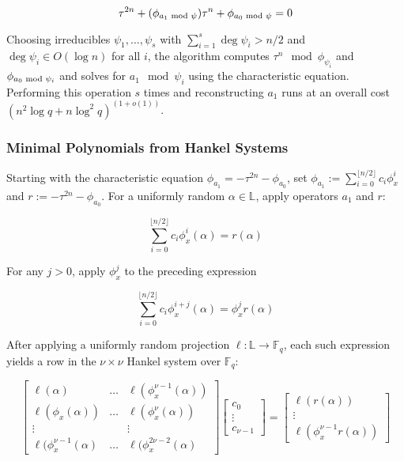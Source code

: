 \documentclass[sigconf]{acmart}
\newcommand{\F}{\mathbb{F}}
\renewcommand{\L}{\mathbb{L}}
\begin{document}
\begin{equation*}
    \tau^{2n} + (\phi_{a_1 \textnormal{ mod } \psi}) \tau^n + \phi_{a_0 \textnormal{ mod } \psi} = 0
\end{equation*}

Choosing irreducibles $\psi_1, \ldots, \psi_s$ with $\sum_{i=1}^s \deg \psi_i > n/2$ and $\deg \psi_i \in O(\log n)$ for all $i$, the algorithm computes $\tau^n \mod \phi_{\psi_i}$ and $\phi_{a_0 \textnormal{ mod } \psi_i}$ and solves for $a_1 \mod \psi_i$ using the characteristic equation. Performing this operation $s$ times and reconstructing $a_1$ runs at an overall cost $(n^2\log q + n \log^2 q)^(1 + o(1))$.

\subsubsection{Minimal Polynomials from Hankel Systems} Starting with the characteristic equation $\phi_{a_1} = -\tau^{2n} - \phi_{a_0}$, set $\phi_{a_1} := \sum_{i=0}^{\lfloor n/2 \rfloor} c_i\phi_{x}^i$ and $r := -\tau^{2n} - \phi_{a_0}$. For a uniformly random $\alpha \in \L$, apply operators $a_1$ and $r$:

\begin{equation*}
    \sum_{i=0}^{\lfloor n/2 \rfloor} c_i\phi_{x}^i(\alpha) = r(\alpha)
\end{equation*}

For any $j > 0$, apply $\phi_x^j$ to the preceding expression

\begin{equation*}
    \sum_{i=0}^{\lfloor n/2 \rfloor} c_i\phi_{x}^{i +j}(\alpha) = \phi_x^jr(\alpha)
\end{equation*}

After applying a uniformly random projection $\ell : \L \to \F_q$, each such expression yields a row in the $\nu \times \nu$ Hankel system over $\F_q$:

\begin{equation*}
    \begin{bmatrix}
    \ell(\alpha) & \ldots & \ell(\phi_x^{\nu - 1}(\alpha)) \\
    \ell(\phi_x(\alpha)) & \ldots & \ell(\phi_x^{\nu}(\alpha)) \\
    \vdots & & \vdots \\
    \ell(\phi_x^{\nu - 1}(\alpha) & \ldots & \ell(\phi_x^{2\nu - 2}(\alpha)
    \end{bmatrix}
    \begin{bmatrix}c_0 \\ \vdots \\ c_{\nu - 1} \end{bmatrix} = 
    \begin{bmatrix} \ell (r(\alpha)) \\ \vdots \\ \ell(\phi_x^{\nu - 1}r(\alpha)) \end{bmatrix}
\end{equation*}
\end{document}
